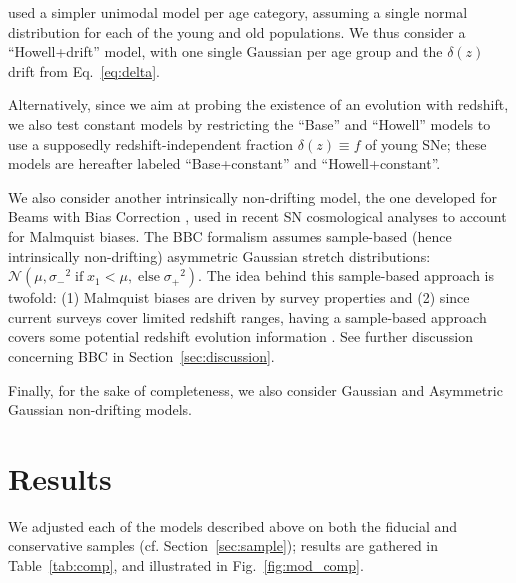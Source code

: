 \documentclass[]{aa} %
\begin{document}
\cite{howell2007} used a simpler unimodal model per age category, assuming a
single normal distribution for each of the young and old populations.  We thus
consider a ``Howell+drift'' model, with one single Gaussian per age group and
the $\delta(z)$ drift from Eq.~\ref{eq:delta}.

Alternatively, since we aim at probing the existence of an evolution with
redshift, we also test constant models by restricting the ``Base'' and
``Howell'' models to use a supposedly redshift-independent fraction $\delta(z)
\equiv f$ of young SNe; these models are hereafter labeled ``Base+constant'' and
``Howell+constant''.

We also consider another intrinsically non-drifting model, the one developed for
Beams with Bias Correction \cite[BBC,][]{scolnic2016, kessler2017}, used in
recent SN cosmological analyses \cite[e.g.][]{scolnic2018a, descosmopaper2019,
riess2016, riess2019} to account for Malmquist biases. The BBC formalism assumes
sample-based (hence intrinsically non-drifting) asymmetric Gaussian stretch
distributions: $\mathcal{N}\left(\mu,
\sigma_-{}^2\;\text{if}\;x_1<\mu,\;\text{else}\;\sigma_+{}^2\right)$. The idea
behind this sample-based approach is twofold: (1) Malmquist biases are driven by
survey properties and (2) since current surveys cover limited redshift ranges,
having a sample-based approach covers some potential redshift evolution
information \citep{scolnic2016, scolnic2018a}. See further discussion
concerning BBC in Section~\ref{sec:discussion}. 

Finally, for the sake of completeness, we also consider Gaussian
and Asymmetric Gaussian non-drifting models. 

\section{Results}\label{sec:results}

We adjusted each of the models described above on both the fiducial and
conservative samples (cf. Section~\ref{sec:sample}); results are gathered
in Table~\ref{tab:comp}, and illustrated in Fig.~\ref{fig:mod_comp}. 
\end{document}
